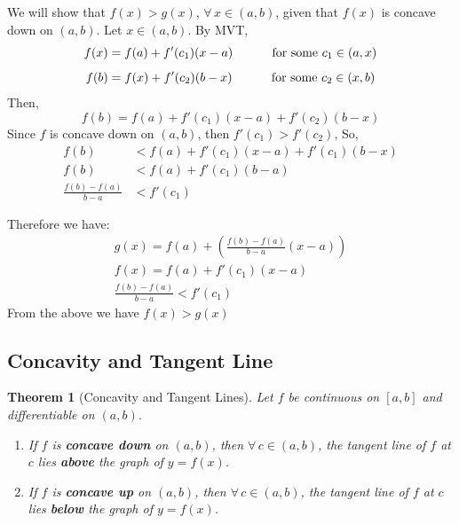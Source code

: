 \documentclass[12pt]{article}
\newcommand\tab[1][1cm]{\hspace*{#1}}
\newtheorem{theorem}{Theorem}
\begin{document}
\begin{figure}[h!] 
    \centering
\end{figure}
\noindent
We will show that $f(x) > g(x)$, $\forall \, x \in (a, b)$, given that $f(x)$ is concave down on $(a, b)$.
\noindent
Let $x \in (a, b)$. By MVT,
\[
    f(x) = f(a) + f'(c_1)(x - a) \textrm{ \tab for some } c_1 \in (a, x)
\]
\[
    f(b) = f(x) + f'(c_2)(b - x) \textrm{ \tab for some } c_2 \in (x, b)
\]
Then,
\[
    f(b) = f(a) + f'(c_1)(x - a) + f'(c_2)(b - x) 
\]
Since $f$ is concave down on $(a, b)$, then $f'(c_1) > f'(c_2)$, So,
\begin{align*} 
    f(b) &< f(a) + f'(c_1)(x - a) + f'(c_1)(b - x) \\
    f(b) &< f(a) + f'(c_1)(b - a) \\
    \frac{f(b) - f(a)}{b - a} &< f'(c_1) 
\end{align*}

Therefore we have:
\begin{align*} 
    g(x) = f(a) + \left(\frac{f(b) - f(a)}{b - a}(x - a) \right) \\
    f(x) = f(a) + f'(c_1)(x - a) \\
    \frac{f(b) - f(a)}{b - a} < f'(c_1) 
\end{align*}
From the above we have $f(x) > g(x)$

\subsection{Concavity and Tangent Line}
\begin{theorem}[Concavity and Tangent Lines]
    Let $f$ be continuous on $[a, b]$ and differentiable on $(a, b)$.
    \begin{enumerate} 
        \item If $f$ is \textbf{concave down} on $(a, b)$, then $\forall \, c \in (a, b)$, the tangent line of $f$ at $c$ lies \textbf{above} the graph of $y = f(x)$.
        \item  If $f$ is \textbf{concave up} on $(a, b)$, then $\forall \, c \in (a, b)$, the tangent line of $f$ at $c$ lies \textbf{below} the graph of $y = f(x)$.
    \end{enumerate}
\end{theorem}
\end{document}
